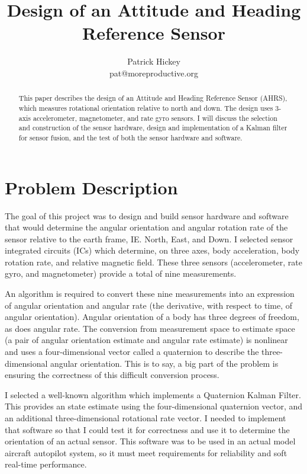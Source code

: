 \documentclass[12pt]{report}
\begin{document}
%
\title{Design of an Attitude and Heading Reference Sensor}
\author{Patrick Hickey\\pat@moreproductive.org}


\begin{abstract}
This paper describes the design of an Attitude and Heading Reference Sensor (AHRS), which measures rotational orientation relative to north and down. 
The design uses 3-axis accelerometer, magnetometer, and rate gyro sensors. 
I will discuss the selection and construction of the sensor hardware, design and implementation of a Kalman filter for sensor fusion, and the test of both the sensor hardware and software.
\end{abstract}


\section{Problem Description}

The goal of this project was to design and build sensor hardware and software that would determine the angular orientation and angular rotation rate of the sensor relative to the earth frame, IE. North, East, and Down. I selected sensor integrated circuits (ICs) which determine, on three axes, body acceleration, body rotation rate, and relative magnetic field. These three sensors (accelerometer, rate gyro, and magnetometer) provide a total of nine measurements. 

An algorithm is required to convert these nine measurements into an expression of angular orientation and angular rate (the derivative, with respect to time, of angular orientation). Angular orientation of a body has three degrees of freedom, as does angular rate. The conversion from measurement space to estimate space (a pair of angular orientation estimate and angular rate estimate) is nonlinear and uses a four-dimensional vector called a quaternion to describe the three-dimensional angular orientation. This is to say, a big part of the problem is ensuring the correctness of this difficult conversion process.   

I selected a well-known algorithm which implements a Quaternion Kalman Filter. This provides an state estimate using the four-dimensional quaternion vector, and an additional three-dimensional rotational rate vector. I needed to implement that software so that I could test it for correctness and use it to determine the orientation of an actual sensor. This software was to be used in an actual model aircraft autopilot system, so it must meet requirements for reliability and soft real-time performance.
\end{document}
